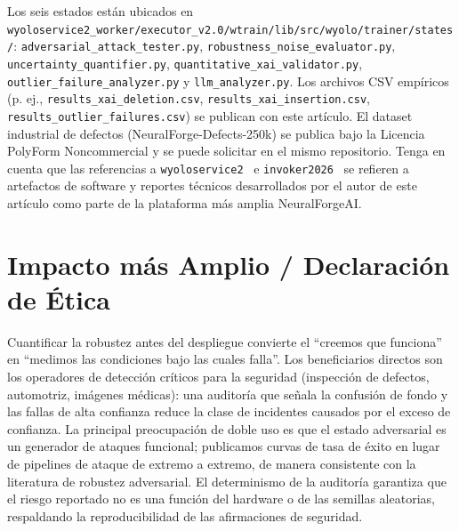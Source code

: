 \documentclass[10pt,twocolumn,letterpaper]{article}
\begin{document}
Los seis estados están ubicados en \texttt{wyoloservice2\_worker/executor\_v2.0/wtrain/lib/src/wyolo/trainer/states/}: \texttt{adversarial\_attack\_tester.py}, \texttt{robustness\_noise\_evaluator.py}, \texttt{uncertainty\_quantifier.py}, \texttt{quantitative\_xai\_validator.py}, \texttt{outlier\_failure\_analyzer.py} y \texttt{llm\_analyzer.py}. Los archivos CSV empíricos (p. ej., \texttt{results\_xai\_deletion.csv}, \texttt{results\_xai\_insertion.csv}, \texttt{results\_outlier\_failures.csv}) se publican con este artículo. El dataset industrial de defectos (NeuralForge-Defects-250k) se publica bajo la Licencia PolyForm Noncommercial y se puede solicitar en el mismo repositorio. Tenga en cuenta que las referencias a \texttt{wyoloservice2}~\cite{wyoloservice2} e \texttt{invoker2026}~\cite{invoker2026} se refieren a artefactos de software y reportes técnicos desarrollados por el autor de este artículo como parte de la plataforma más amplia NeuralForgeAI.

\section{Impacto más Amplio / Declaración de Ética}
\label{sec:ethics}
Cuantificar la robustez antes del despliegue convierte el ``creemos que funciona'' en ``medimos las condiciones bajo las cuales falla''. Los beneficiarios directos son los operadores de detección críticos para la seguridad (inspección de defectos, automotriz, imágenes médicas): una auditoría que señala la confusión de fondo y las fallas de alta confianza reduce la clase de incidentes causados por el exceso de confianza. La principal preocupación de doble uso es que el estado adversarial es un generador de ataques funcional; publicamos curvas de tasa de éxito en lugar de pipelines de ataque de extremo a extremo, de manera consistente con la literatura de robustez adversarial. El determinismo de la auditoría garantiza que el riesgo reportado no es una función del hardware o de las semillas aleatorias, respaldando la reproducibilidad de las afirmaciones de seguridad.
\end{document}
